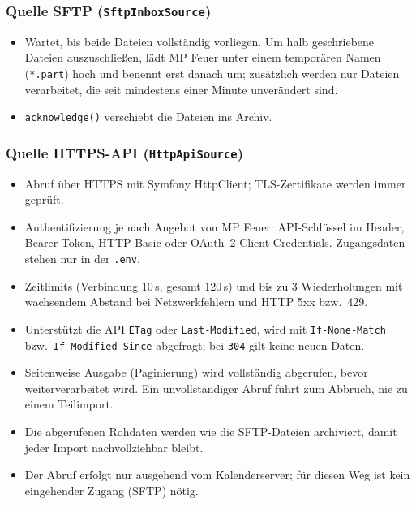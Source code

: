 \documentclass[a4paper,fontsize=10pt]{scrartcl}
\newcommand{\code}[1]{\texttt{#1}}
\begin{document}
\subsubsection*{Quelle SFTP (\code{SftpInboxSource})}

\begin{itemize}
  \item Wartet, bis beide Dateien vollständig vorliegen. Um halb
        geschriebene Dateien auszuschließen, lädt MP Feuer unter einem
        temporären Namen (\code{*.part}) hoch und benennt erst danach um;
        zusätzlich werden nur Dateien verarbeitet, die seit mindestens
        einer Minute unverändert sind.
  \item \code{acknowledge()} verschiebt die Dateien ins Archiv.
\end{itemize}

\subsubsection*{Quelle HTTPS-API (\code{HttpApiSource})}

\begin{itemize}
  \item Abruf über HTTPS mit Symfony HttpClient; TLS-Zertifikate werden
        immer geprüft.
  \item Authentifizierung je nach Angebot von MP Feuer: API-Schlüssel im
        Header, Bearer-Token, HTTP Basic oder OAuth~2 Client Credentials.
        Zugangsdaten stehen nur in der \code{.env}.
  \item Zeitlimits (Verbindung 10\,s, gesamt 120\,s) und bis zu 3
        Wiederholungen mit wachsendem Abstand bei Netzwerkfehlern und
        HTTP 5xx bzw.\ 429.
  \item Unterstützt die API \code{ETag} oder \code{Last-Modified}, wird mit
        \code{If-None-Match} bzw.\ \code{If-Modified-Since} abgefragt;
        bei \code{304} gilt \glqq keine neuen Daten\grqq.
  \item Seitenweise Ausgabe (Paginierung) wird vollständig abgerufen, bevor
        weiterverarbeitet wird. Ein unvollständiger Abruf führt zum
        Abbruch, nie zu einem Teilimport.
  \item Die abgerufenen Rohdaten werden wie die SFTP-Dateien archiviert,
        damit jeder Import nachvollziehbar bleibt.
  \item Der Abruf erfolgt nur ausgehend vom Kalenderserver; für diesen Weg
        ist kein eingehender Zugang (SFTP) nötig.
\end{itemize}
\end{document}
